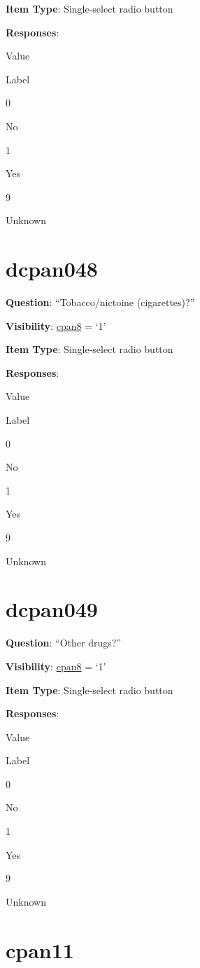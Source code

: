 \documentclass[]{book}
\begin{document}
\textbf{Item Type}: Single-select radio button

\textbf{Responses}:

Value

Label

0

No

1

Yes

9

Unknown

\hypertarget{dcpan048}{%
\section{dcpan048}\label{dcpan048}}

\textbf{Question}: ``Tobacco/nictoine (cigarettes)?''

\textbf{Visibility}: \protect\hyperlink{cpan8}{cpan8} = `1'

\textbf{Item Type}: Single-select radio button

\textbf{Responses}:

Value

Label

0

No

1

Yes

9

Unknown

\hypertarget{dcpan049}{%
\section{dcpan049}\label{dcpan049}}

\textbf{Question}: ``Other drugs?''

\textbf{Visibility}: \protect\hyperlink{cpan8}{cpan8} = `1'

\textbf{Item Type}: Single-select radio button

\textbf{Responses}:

Value

Label

0

No

1

Yes

9

Unknown

\hypertarget{cpan11}{%
\section{cpan11}\label{cpan11}}
\end{document}
